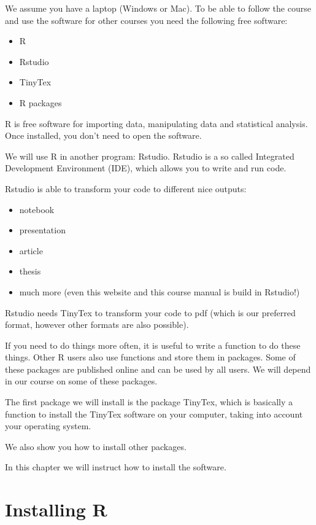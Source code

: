 \documentclass[
]{book}
\providecommand{\tightlist}{%
  \setlength{\itemsep}{0pt}\setlength{\parskip}{0pt}}
\begin{document}
We assume you have a laptop (Windows or Mac). To be able to follow the course and use the software for other courses you need the following free software:

\begin{itemize}
\tightlist
\item
  R
\item
  Rstudio
\item
  TinyTex
\item
  R packages
\end{itemize}

R is free software for importing data, manipulating data and statistical analysis. Once installed, you don't need to open the software.

We will use R in another program: Rstudio. Rstudio is a so called Integrated Development Environment (IDE), which allows you to write and run code.

Rstudio is able to transform your code to different nice outputs:

\begin{itemize}
\tightlist
\item
  notebook
\item
  presentation
\item
  article
\item
  thesis
\item
  much more (even this website and this course manual is build in Rstudio!)
\end{itemize}

Rstudio needs TinyTex to transform your code to pdf (which is our preferred format, however other formats are also possible).

If you need to do things more often, it is useful to write a function to do these things. Other R users also use functions and store them in packages. Some of these packages are published online and can be used by all users. We will depend in our course on some of these packages.

The first package we will install is the package TinyTex, which is basically a function to install the TinyTex software on your computer, taking into account your operating system.

We also show you how to install other packages.

In this chapter we will instruct how to install the software.

\hypertarget{installing-r}{%
\section{Installing R}\label{installing-r}}
\end{document}
